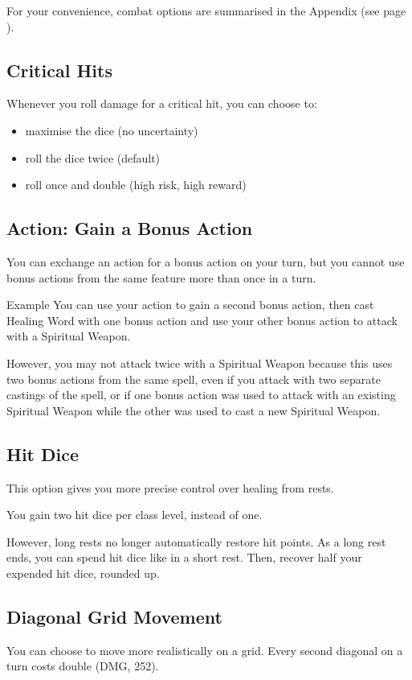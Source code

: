 \documentclass[letterpaper,twocolumn,openany,nodeprecatedcode,bg=print]{dndbook}
\newcommand{\pg}[1]{page \pageref{#1}}
\newcommand{\see}[1]{(see \pg{#1})}
\begin{document}
For your convenience, combat options are summarised in the Appendix \see{combat-options}.

\subsection{Critical Hits}
\label{critical-hit}
Whenever you roll damage for a critical hit, you can choose to:
\begin{itemize}
\item maximise the dice (no uncertainty)
\item roll the dice twice (default)
\item roll once and double (high risk, high reward)
\end{itemize}

\subsection{Action: Gain a Bonus Action}
\label{gameplay-bonus-action}
You can exchange an action for a bonus action on your turn, 
but you cannot use bonus actions from the same feature more than once in a turn.

\begin{DndComment}{Example}
You can use your action to gain a second bonus action, 
then cast Healing Word with one bonus action 
and use your other bonus action to attack with a Spiritual Weapon. 

However, you may not attack twice with a Spiritual Weapon because this uses two bonus actions from the same spell, 
even if you attack with two separate castings of the spell, 
or if one bonus action was used to attack with an existing Spiritual Weapon while the other was used to cast a new Spiritual Weapon.
\end{DndComment}

\subsection{Hit Dice}
This option gives you more precise control over healing from rests.

You gain two hit dice per class level, instead of one.

However, long rests no longer automatically restore hit points. 
As a long rest ends, you can spend hit dice like in a short rest. 
Then, recover half your expended hit dice, rounded up.

\subsection{Diagonal Grid Movement}
You can choose to move more realistically on a grid. 
Every second diagonal on a turn costs double (DMG, 252). 
\end{document}
